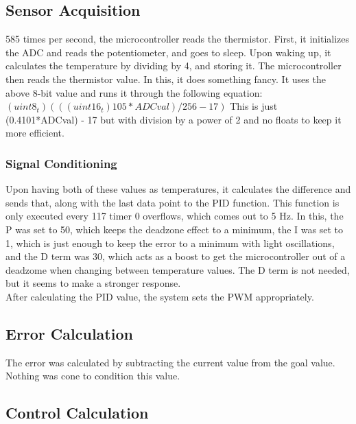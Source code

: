 \documentclass{hitec}
\begin{document}
\subsection{Sensor Acquisition}
585 times per second, the microcontroller reads the thermistor. First, it initializes the ADC and reads the potentiometer, and goes to sleep. Upon waking up, it calculates the temperature by dividing by 4, and storing it. The microcontroller then reads the thermistor value. In this, it does something fancy. It uses the above 8-bit value and runs it through the following equation: $(uint8_t)(((uint16_t)105*ADCval)/256 - 17)$ This is just (0.4101*ADCval) - 17 but with division by a power of 2 and no floats to keep it more efficient. 
\subsubsection{Signal Conditioning}
Upon having both of these values as temperatures, it calculates the difference and sends that, along with the last data point to the PID function. This function is only executed every 117 timer 0 overflows, which comes out to 5 Hz. In this, the P was set to 50, which keeps the deadzone effect to a minimum, the I was set to 1, which is just enough to keep the error to a minimum with light oscillations, and the D term was 30, which acts as a boost to get the microcontroller out of a deadzome when changing between temperature values. The D term is not needed, but it seems to make a stronger response. 
\\
After calculating the PID value, the system sets the PWM appropriately. 
\subsection{Error Calculation}
The error was calculated by subtracting the current value from the goal value. Nothing was cone to condition this value.
\subsection{Control Calculation}
\end{document}
